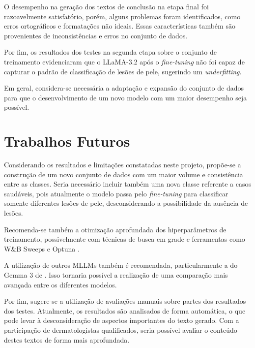 O desempenho na geração dos textos de conclusão na etapa final foi razoavelmente satisfatório, porém, alguns problemas
foram identificados, como erros ortográficos e formatações não ideais. Essas características também são provenientes de
inconsistências e erros no conjunto de dados.

Por fim, os resultados dos testes na segunda etapa sobre o conjunto de treinamento evidenciaram que o \ac{LLaMA}-3.2
após o \textit{fine-tuning} não foi capaz de capturar o padrão de classificação de lesões de pele, sugerindo um
\textit{underfitting}.

Em geral, considera-se necessária a adaptação e expansão do conjunto de dados para que o desenvolvimento de um novo
modelo com um maior desempenho seja possível.

\section{Trabalhos Futuros}

Considerando os resultados e limitações constatadas neste projeto, propõe-se a construção de um novo conjunto de dados
com um maior volume e consistência entre as classes. Seria necessário incluir também uma nova classe referente a casos
saudáveis, pois atualmente o modelo passa pelo \textit{fine-tuning} para classificar somente diferentes lesões de pele,
desconsiderando a possibilidade da ausência de lesões.

Recomenda-se também a otimização aprofundada dos hiperparâmetros de treinamento, possivelmente com técnicas de busca em
grade e ferramentas como W\&B Sweeps e Optuna \cite{wab_sweeps, optuna_2019}.

A utilização de outros \acp{MLLM} também é recomendada, particularmente a do Gemma 3 de \textcite{team2025gemma}. Isso
tornaria possível a realização de uma comparação mais avançada entre os diferentes modelos.

Por fim, sugere-se a utilização de avaliações manuais sobre partes dos resultados dos testes. Atualmente, os resultados
são analisados de forma automática, o que pode levar à desconsideração de aspectos importantes do texto gerado. Com a
participação de dermatologistas qualificados, seria possível avaliar o conteúdo destes textos de forma mais
aprofundada.

